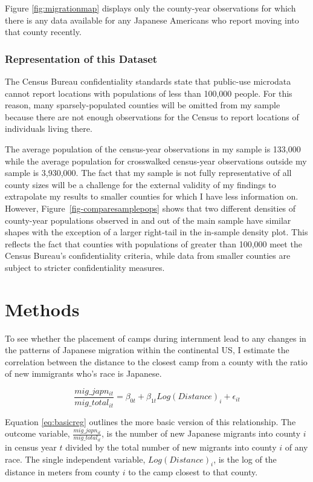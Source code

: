 \documentclass[12pt]{article}
\begin{document}
Figure \ref{fig:migrationmap} displays only the county-year observations for which there is any data available for any Japanese Americans who report moving into that county recently. 

\subsubsection{Representation of this Dataset}

The Census Bureau confidentiality standards state that public-use
microdata cannot report locations with populations of less
than 100,000 people. For this reason, many sparsely-populated counties
will be omitted from my sample because there are not enough observations
for the Census to report locations of individuals living there.


The average population of the census-year observations in my sample is
133,000 while the average population for
crosswalked census-year observations outside my sample is
3,930,000. The fact that my sample is not
fully representative of all county sizes will be a challenge for the
external validity of my findings to extrapolate my results to smaller
counties for which I have less information on. However,
Figure~\ref{fig-comparesamplepops} shows that two different densities of
county-year populations observed in and out of the main sample have
similar shapes with the exception of a larger right-tail in the
in-sample density plot. This reflects the fact that counties with
populations of greater than 100,000 meet the Census Bureau's
confidentiality criteria, while data from smaller counties are subject
to stricter confidentiality measures.

\section{Methods}\label{methods}

To see whether the placement of camps during internment lead to any changes in the patterns of Japanese migration within the continental US, I estimate the correlation between the distance to the closest camp from a county with the ratio of new immigrants who's race is Japanese. 

\begin{equation}\label{eq:basicreg}
    \frac{mig\_japn_{it}}{mig\_total_{it}} = \beta_{0t} + \beta_{1t} Log(Distance)_i  +  \epsilon_{it}
\end{equation}


Equation \ref{eq:basicreg} outlines the more basic version of this relationship. 
The outcome variable, $\frac{mig\_japn_{it}}{mig\_total_{it}}$, is the number of new Japanese migrants into county $i$ in census year $t$ divided by the total number of new migrants into county $i$ of any race.
The single independent variable, $Log(Distance)_i$, is the log of the distance in meters from county $i$ to the camp closest to that county.
\end{document}
